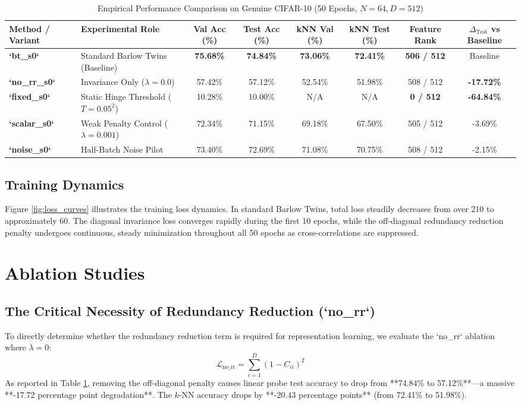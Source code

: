 \documentclass[conference]{IEEEtran}
\begin{document}
\begin{table}[t]
\centering
\caption{Empirical Performance Comparison on Genuine CIFAR-10 (50 Epochs, $N=64, D=512$)}
\label{tab:results}
\begin{tabular}{llcccccc}
\toprule
\textbf{Method / Variant} & \textbf{Experimental Role} & \textbf{Val Acc (\%)} & \textbf{Test Acc (\%)} & \textbf{kNN Val (\%)} & \textbf{kNN Test (\%)} & \textbf{Feature Rank} & \textbf{$\Delta_{\text{Test}}$ vs Baseline} \\
\midrule
\textbf{`bt_s0`} & Standard Barlow Twins (Baseline) & \textbf{75.68\%} & \textbf{74.84\%} & \textbf{73.06\%} & \textbf{72.41\%} & \textbf{506 / 512} & Baseline \\
\textbf{`no_rr_s0`} & Invariance Only ($\lambda = 0.0$) & 57.42\% & 57.12\% & 52.54\% & 51.98\% & 508 / 512 & \textbf{-17.72\%} \\
\textbf{`fixed_s0`} & Static Hinge Threshold ($T=0.05^2$) & 10.28\% & 10.00\% & N/A & N/A & \textbf{0 / 512} & \textbf{-64.84\%} \\
\textbf{`scalar_s0`} & Weak Penalty Control ($\lambda = 0.001$) & 72.34\% & 71.15\% & 69.18\% & 67.50\% & 505 / 512 & -3.69\% \\
\textbf{`noise_s0`} & Half-Batch Noise Pilot & 73.40\% & 72.69\% & 71.08\% & 70.75\% & 508 / 512 & -2.15\% \\
\bottomrule
\end{tabular}
\end{table}

\subsection{Training Dynamics}
Figure \ref{fig:loss_curves} illustrates the training loss dynamics. In standard Barlow Twins, total loss steadily decreases from over 210 to approximately 60. The diagonal invariance loss converges rapidly during the first 10 epochs, while the off-diagonal redundancy reduction penalty undergoes continuous, steady minimization throughout all 50 epochs as cross-correlations are suppressed.

\section{Ablation Studies}

\subsection{The Critical Necessity of Redundancy Reduction (`no_rr`)}
To directly determine whether the redundancy reduction term is required for representation learning, we evaluate the `no_rr` ablation where $\lambda = 0$:
\begin{equation}
    \mathcal{L}_{\text{no\_rr}} = \sum_{i=1}^D (1 - C_{ii})^2
\end{equation}
As reported in Table \ref{tab:results}, removing the off-diagonal penalty causes linear probe test accuracy to drop from **74.84\% to 57.12\%**—a massive **-17.72 percentage point degradation**. The $k$-NN accuracy drops by **-20.43 percentage points** (from 72.41\% to 51.98\%).
\end{document}

